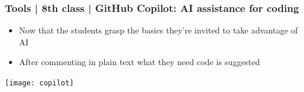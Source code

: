 \documentclass[aspectratio=169]{beamer}
\begin{document}
\begin{frame}
	\frametitle{Tools | 8th class | GitHub Copilot: AI assistance for coding}
	\begin{block}{}
		\begin{itemize}
			\item Now that the students grasp the basics they're invited to take advantage of AI
			\item After commenting in plain text what they need code is suggested
		\end{itemize}
	\texttt{[image: copilot]}
	\end{block}
\end{frame}
\end{document}
